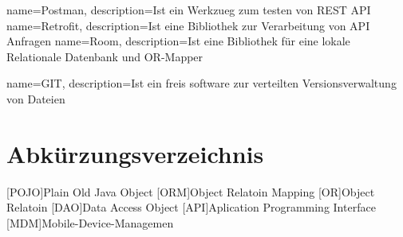 
{
	name=Postman,
	description={Ist ein Werkzueg zum testen von REST API}
}
{
	name=Retrofit,
	description={Ist eine Bibliothek zur Verarbeitung von API Anfragen}
}
{
	name=Room,
	description={Ist eine Bibliothek für eine lokale Relationale Datenbank und OR-Mapper}
}


{
	name=GIT,
	description={Ist ein freis software zur verteilten Versionsverwaltung von Dateien}
}

\chapter{Abkürzungsverzeichnis}
\begin{acronym}
	[POJO]{Plain Old Java Object}
	[ORM]{Object Relatoin Mapping}
	[OR]{Object Relatoin}
	[DAO]{Data Access Object}
	[API]{Aplication Programming Interface}
	[MDM]{Mobile-Device-Managemen}
	
	
\end{acronym}